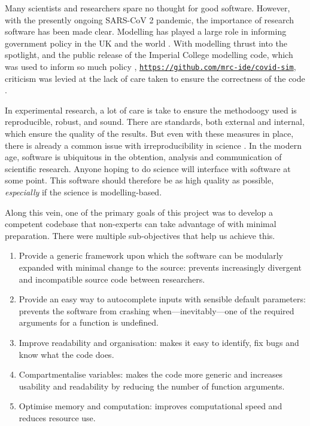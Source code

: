 Many scientists and researchers spare no thought for good software. However, with the presently ongoing SARS-CoV 2 pandemic, the importance of research software has been made clear. Modelling has played a large role in informing government policy in the UK and the world \cite{covidScotland,covidUK1,covidUK2}. With modelling thrust into the spotlight, and the public release of the Imperial College modelling code, which was used to inform so much policy \cite{covidUK2}, \href{https://github.com/mrc-ide/covid-sim}{\texttt{https://github.com/mrc-ide/covid-sim}}, criticism was levied at the lack of care taken to ensure the correctness of the code \cite{natureModelCritique}.

In experimental research, a lot of care is take to ensure the methodoogy used is reproducible, robust, and sound. There are standards, both external and internal, which ensure the quality of the results. But even with these measures in place, there is already a common issue with irreproducibility in science \cite{mede2020replication,randall2018irreproducibility,bolli2015reflections}. In the modern age, software is ubiquitous in the obtention, analysis and communication of scientific research. Anyone hoping to do science will interface with software at some point. This software should therefore be as high quality as possible, \emph{especially} if the science is modelling-based.

Along this vein, one of the primary goals of this project was to develop a competent codebase that non-experts can take advantage of with minimal preparation. There were multiple sub-objectives that help us achieve this.
\begin{enumerate}
    \item Provide a generic framework upon which the software can be modularly expanded with minimal change to the source: prevents increasingly divergent and incompatible source code between researchers.
    \item Provide an easy way to autocomplete inputs with sensible default parameters: prevents the software from crashing when---inevitably---one of the required arguments for a function is undefined.
    \item Improve readability and organisation: makes it easy to identify, fix bugs and know what the code does.
    \item Compartmentalise variables: makes the code more generic and increases usability and readability by reducing the number of function arguments.
    \item Optimise memory and computation: improves computational speed and reduces resource use.
\end{enumerate}

